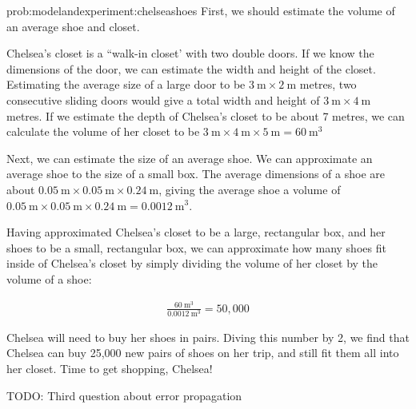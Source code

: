 \begin{solution}{prob:modelandexperiment:chelseashoes}\label{soln:modelandexperiment:chelseashoes}
First, we should estimate the volume of an average shoe and closet.

Chelsea's closet is a ``walk-in closet' with two double doors. If we know the dimensions of the door, we can estimate the width and height of the closet. Estimating the average size of a large door to be $\SI{3}{\meter}\times \SI{2}{\meter}$ metres, two consecutive sliding doors would give a total width and height of $\SI{3}{\meter}\times \SI{4}{\meter}$ metres. If we estimate the depth of Chelsea's closet to be about 7 metres, we can calculate the volume of her closet to be $\SI{3}{\meter}\times \SI{4}{\meter}\times \SI{5}{\meter} = \SI{60}{\meter\cubed}$


Next, we can estimate the size of an average shoe. We can approximate an average shoe to the size of a small box. The average dimensions of a shoe are about $\SI{0.05}{\meter}\times \SI{0.05}{\meter}\times \SI{0.24}{\meter}$, giving the average shoe a volume of $\SI{0.05}{\meter}\times \SI{0.05}{\meter}\times \SI{0.24}{\meter} = \SI{0.0012}{\meter\cubed}$.


Having approximated Chelsea's closet to be a large, rectangular box, and her shoes to be a small, rectangular box, we can approximate how many shoes fit inside of Chelsea's closet by simply dividing the volume of her closet by the volume of a shoe:

\begin{align*}
\frac{\SI{60}{\meter\cubed}}{\SI{0.0012}{\meter\cubed}}= 50,000 
\end{align*}

Chelsea will need to buy her shoes in pairs. Diving this number by 2, we find that Chelsea can buy 25,000 new pairs of shoes on her trip, and still fit them all into her closet. Time to get shopping, Chelsea!
\end{solution}

TODO: Third question about error propagation